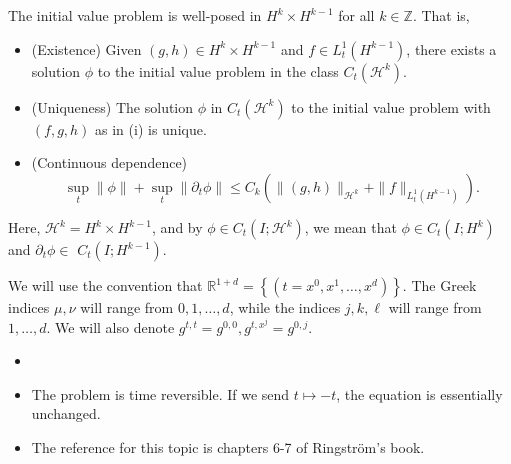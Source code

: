 \begin{theorem}
    \label{thm: well posedness of VCWE}
    The initial value problem is well-posed in $H^{k} \times H^{k-1}$ for all $k \in \mathbb{Z}$. That is,
    \begin{itemize}
        \item (Existence) Given $(g, h) \in H^{k} \times H^{k-1}$ and $f \in L_{t}^{1}\left(H^{k-1}\right)$, there exists a solution $\phi$ to the initial value problem in the class $C_{t}\left(\mathcal{H}^{k}\right)$.
        \item (Uniqueness) The solution $\phi$ in $C_{t}\left(\mathcal{H}^{k}\right)$ to the initial value problem with $(f, g, h)$ as in (i) is unique.
        \item (Continuous dependence)
        $$
        \sup _{t}\left\|\phi \right\| + \sup_t \left \| \partial_{t} \phi \right\| \leq C_{k}\left(\|(g, h)\|_{\mathcal{H}^{k}}+\|f\|_{L_{t}^{1}\left(H^{k-1}\right)}\right) .
        $$
    \end{itemize} 
\end{theorem}
Here, $\mathcal{H}^{k}=H^{k} \times H^{k-1}$, and by $\phi \in C_{t}\left(I ; \mathcal{H}^{k}\right)$, we mean that $\phi \in C_{t}\left(I ; H^{k}\right)$ and $\partial_{t} \phi \in$ $C_{t}\left(I ; H^{k-1}\right)$.

We will use the convention that $\mathbb{R}^{1+d}=\left\{\left(t=x^{0}, x^{1}, \ldots, x^{d}\right)\right\}$. The Greek indices $\mu, \nu$ will range from $0,1, \ldots, d$, while the indices $j, k, \ell$ will range from $1, \ldots, d$. We will also denote $g^{t, t}=g^{0,0}, g^{t, x^{j}}=g^{0, j}$.

\begin{remark}
\begin{itemize}
    \item []
    \item The problem is time reversible. If we send $t \mapsto-t$, the equation is essentially unchanged.
    \item The  reference  for  this  topic  is  chapters  6-7  of  Ringstr\"om's  book.
\end{itemize}
\end{remark}

